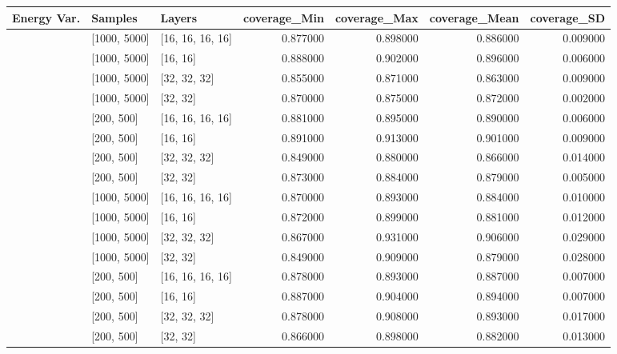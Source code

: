 \begin{tabular}{lllrrrr}
\toprule
Energy Var. & Samples & Layers & coverage_Min & coverage_Max & coverage_Mean & coverage_SD \\
\midrule
[0.001, 0.0001] & [1000, 5000] & [16, 16, 16, 16] & 0.877000 & 0.898000 & 0.886000 & 0.009000 \\
[0.001, 0.0001] & [1000, 5000] & [16, 16] & 0.888000 & 0.902000 & 0.896000 & 0.006000 \\
[0.001, 0.0001] & [1000, 5000] & [32, 32, 32] & 0.855000 & 0.871000 & 0.863000 & 0.009000 \\
[0.001, 0.0001] & [1000, 5000] & [32, 32] & 0.870000 & 0.875000 & 0.872000 & 0.002000 \\
[0.001, 0.0001] & [200, 500] & [16, 16, 16, 16] & 0.881000 & 0.895000 & 0.890000 & 0.006000 \\
[0.001, 0.0001] & [200, 500] & [16, 16] & 0.891000 & 0.913000 & 0.901000 & 0.009000 \\
[0.001, 0.0001] & [200, 500] & [32, 32, 32] & 0.849000 & 0.880000 & 0.866000 & 0.014000 \\
[0.001, 0.0001] & [200, 500] & [32, 32] & 0.873000 & 0.884000 & 0.879000 & 0.005000 \\
[0.1, 0.01] & [1000, 5000] & [16, 16, 16, 16] & 0.870000 & 0.893000 & 0.884000 & 0.010000 \\
[0.1, 0.01] & [1000, 5000] & [16, 16] & 0.872000 & 0.899000 & 0.881000 & 0.012000 \\
[0.1, 0.01] & [1000, 5000] & [32, 32, 32] & 0.867000 & 0.931000 & 0.906000 & 0.029000 \\
[0.1, 0.01] & [1000, 5000] & [32, 32] & 0.849000 & 0.909000 & 0.879000 & 0.028000 \\
[0.1, 0.01] & [200, 500] & [16, 16, 16, 16] & 0.878000 & 0.893000 & 0.887000 & 0.007000 \\
[0.1, 0.01] & [200, 500] & [16, 16] & 0.887000 & 0.904000 & 0.894000 & 0.007000 \\
[0.1, 0.01] & [200, 500] & [32, 32, 32] & 0.878000 & 0.908000 & 0.893000 & 0.017000 \\
[0.1, 0.01] & [200, 500] & [32, 32] & 0.866000 & 0.898000 & 0.882000 & 0.013000 \\
\bottomrule
\end{tabular}
